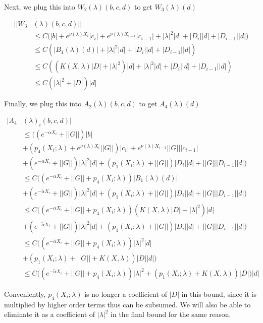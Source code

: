 \documentclass[12pt]{article}
\begin{document}
\begin{enumerate}
Next, we plug this into $W_2(\lambda)(b, c, d)$ to get $W_3(\lambda)(d)$

\begin{align*}
||W_3&(\lambda)(b,c,d)|| \\
&\leq C \Big( |b| + e^{\nu(\lambda)X_i} |c_i| + e^{\nu(\lambda)X_{i-1}} |c_{i-1}| 
+ |\lambda|^2 |d| + |D_i||d| + |D_{i-1}||d|) \\
&\leq C( |B_1(\lambda)(d)|+ |\lambda|^2 |d| + |D_i||d| + |D_{i-1}||d|) \\
&\leq C( ( K(X, \lambda) |D|+ |\lambda|^2 )|d| + |\lambda|^2 |d| + |D_i||d| + |D_{i-1}||d|) \\
&\leq C( |\lambda|^2 + |D|)|d|
\end{align*}

Finally, we plug this into $A_2(\lambda)(b, c, d)$ to get $A_4(\lambda)(d)$

\begin{align*}
|A_4&(\lambda)_i(b, c, d)| \\
&\leq \Big( (e^{-\alpha X_i} + ||G|| )|b| \\
&+ (p_4(X_i; \lambda) + e^{\nu(\lambda)X_i} ||G||) |c_i| + e^{\nu(\lambda)X_{i-1}} ||G|| |c_{i-1}| \\
&+ (e^{-\tilde{\alpha} X_i} + ||G||)|\lambda|^2 |d| 
+ (p_1(X_i; \lambda) + ||G||) |D_i| |d| 
+ ||G|| |D_{i-1}| |d| \Big) \\
&\leq C \Big( (e^{-\alpha X_i} + ||G|| + p_4(X_i; \lambda))|B_1(\lambda)(d)|\\
&+ (e^{-\tilde{\alpha} X_i} + ||G||)|\lambda|^2 |d| 
+ (p_1(X_i; \lambda) + ||G||) |D_i| |d| 
+ ||G|| |D_{i-1}| |d| \Big) \\
&\leq C \Big( (e^{-\alpha X_i} + ||G|| + p_4(X_i; \lambda))
( K(X, \lambda) |D|+ |\lambda|^2 )|d|\\
&+ (e^{-\tilde{\alpha} X_i} + ||G||)|\lambda|^2 |d| 
+ (p_1(X_i; \lambda) + ||G||) |D_i| |d| 
+ ||G|| |D_{i-1}| |d| \Big) \\
&\leq C \Big( (e^{-\tilde{\alpha} X_i} + ||G|| + p_4(X_i; \lambda))|\lambda|^2 |d| \\ 
&+ (p_1(X_i; \lambda) + ||G|| + K(X, \lambda) ) |D| |d| \Big) \\
&\leq C \Big( (e^{-\tilde{\alpha} X_i} + ||G|| + p_4(X_i; \lambda))|\lambda|^2 + (p_1(X_i; \lambda) + K(X, \lambda) ) |D| \Big)|d|
\end{align*}

Conveniently, $p_4(X_i; \lambda)$ is no longer a coefficient of $|D|$ in this bound, since it is multiplied by higher order terms thus can be subsumed. We will also be able to eliminate it as a coefficient of $|\lambda|^2$ in the final bound for the same reason.


\end{enumerate}
\end{document}
